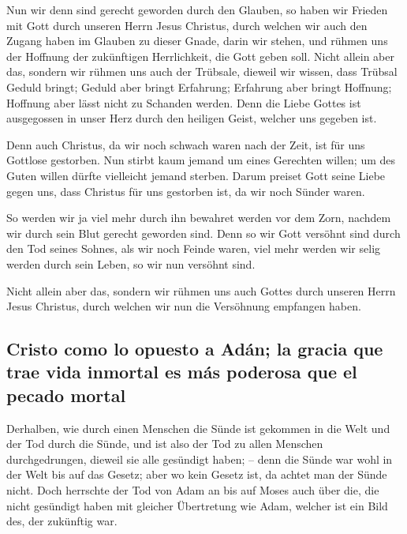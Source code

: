  Nun wir denn sind gerecht geworden durch den Glauben, so
haben wir Frieden mit Gott durch unseren Herrn Jesus Christus,
 durch welchen wir auch den Zugang haben im Glauben zu
dieser Gnade, darin wir stehen, und rühmen uns der Hoffnung der
zukünftigen Herrlichkeit, die Gott geben soll.  Nicht
allein aber das, sondern wir rühmen uns auch der Trübsale, dieweil wir
wissen, dass Trübsal Geduld bringt;  Geduld aber bringt
Erfahrung; Erfahrung aber bringt Hoffnung;  Hoffnung aber
lässt nicht zu Schanden werden. Denn die Liebe Gottes ist ausgegossen in
unser Herz durch den heiligen Geist, welcher uns gegeben ist.

 Denn auch Christus, da wir noch schwach waren nach der
Zeit, ist für uns Gottlose gestorben.  Nun stirbt kaum
jemand um eines Gerechten willen; um des Guten willen dürfte vielleicht
jemand sterben.  Darum preiset Gott seine Liebe gegen uns,
dass Christus für uns gestorben ist, da wir noch Sünder waren.

 So werden wir ja viel mehr durch ihn bewahret werden vor
dem Zorn, nachdem wir durch sein Blut gerecht geworden sind.
 Denn so wir Gott versöhnt sind durch den Tod seines
Sohnes, als wir noch Feinde waren, viel mehr werden wir selig werden
durch sein Leben, so wir nun versöhnt sind.

 Nicht allein aber das, sondern wir rühmen uns auch
Gottes durch unseren Herrn Jesus Christus, durch welchen wir nun die
Versöhnung empfangen haben.

\hypertarget{cristo-como-lo-opuesto-a-aduxe1n-la-gracia-que-trae-vida-inmortal-es-muxe1s-poderosa-que-el-pecado-mortal}{%
\subsection{Cristo como lo opuesto a Adán; la gracia que trae vida
inmortal es más poderosa que el pecado
mortal}\label{cristo-como-lo-opuesto-a-aduxe1n-la-gracia-que-trae-vida-inmortal-es-muxe1s-poderosa-que-el-pecado-mortal}}

 Derhalben, wie durch einen Menschen die Sünde ist
gekommen in die Welt und der Tod durch die Sünde, und ist also der Tod
zu allen Menschen durchgedrungen, dieweil sie alle gesündigt haben; --
 denn die Sünde war wohl in der Welt bis auf das Gesetz;
aber wo kein Gesetz ist, da achtet man der Sünde nicht. 
Doch herrschte der Tod von Adam an bis auf Moses auch über die, die
nicht gesündigt haben mit gleicher Übertretung wie Adam, welcher ist ein
Bild des, der zukünftig war.

